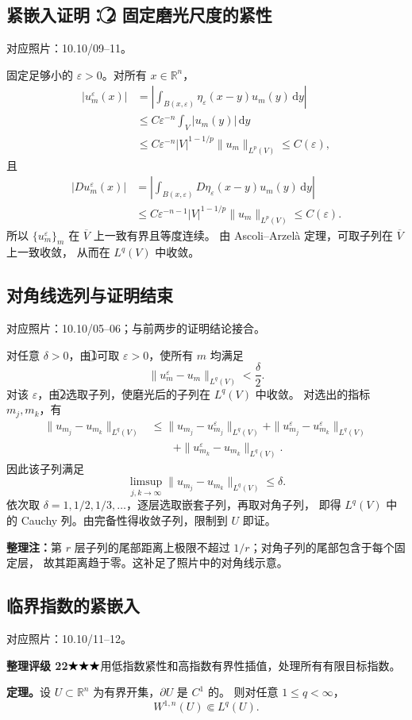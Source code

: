 \documentclass[UTF8,a4paper,11pt,fontset=fandol]{ctexart}
\newcommand{\R}{\mathbb R}
\newcommand{\dd}{\,\mathrm d}
\newcommand{\ednote}[1]{\par{\small\color{notegray}\textbf{整理注：}#1}\par}
\newcommand{\source}[1]{{\small\color{notegray}对应照片：#1。}\par}
\newcommand{\proofstars}[1]{\ensuremath{%
\ifnum#1>0\relax\bigstar\fi
\ifnum#1>1\relax\bigstar\fi
\ifnum#1>2\relax\bigstar\fi
\ifnum#1>3\relax\bigstar\fi
\ifnum#1>4\relax\bigstar\fi}}
\newcommand{\proofrating}[3]{\par{\small\color{proofblue}%
\textbf{整理评级 #1}\enspace\proofstars{#2}\quad #3\par}}
\begin{document}
\newpage
\subsection*{紧嵌入证明：\textcircled{2} 固定磨光尺度的紧性}
\source{10.10/09--11}
固定足够小的 $\varepsilon>0$。对所有 $x\in\R^n$，
\[
\begin{aligned}
|u_m^\varepsilon(x)|
&=\left|\int_{B(x,\varepsilon)}\eta_\varepsilon(x-y)u_m(y)\dd y\right|\\
&\leq C\varepsilon^{-n}\int_V|u_m(y)|\dd y\\
&\leq C\varepsilon^{-n}|V|^{1-1/p}\|u_m\|_{L^p(V)}
\leq C(\varepsilon),
\end{aligned}
\]
且
\[
\begin{aligned}
|Du_m^\varepsilon(x)|
&=\left|\int_{B(x,\varepsilon)}D\eta_\varepsilon(x-y)u_m(y)\dd y\right|\\
&\leq C\varepsilon^{-n-1}|V|^{1-1/p}\|u_m\|_{L^p(V)}
\leq C(\varepsilon).
\end{aligned}
\]
所以 $\{u_m^\varepsilon\}_m$ 在 $\overline V$ 上一致有界且等度连续。
由 Ascoli--Arzelà 定理，可取子列在 $\overline V$ 上一致收敛，
从而在 $L^q(V)$ 中收敛。

\subsection*{对角线选列与证明结束}
\source{10.10/05--06；与前两步的证明结论接合}
对任意 $\delta>0$，由\textcircled{1}可取 $\varepsilon>0$，使所有 $m$ 均满足
\[
\|u_m^\varepsilon-u_m\|_{L^q(V)}<\frac\delta2.
\]
对该 $\varepsilon$，由\textcircled{2}选取子列，使磨光后的子列在 $L^q(V)$ 中收敛。
对选出的指标 $m_j,m_k$，有
\[
\begin{aligned}
\|u_{m_j}-u_{m_k}\|_{L^q(V)}
&\leq\|u_{m_j}-u_{m_j}^\varepsilon\|_{L^q(V)}
 +\|u_{m_j}^\varepsilon-u_{m_k}^\varepsilon\|_{L^q(V)}\\
&\qquad+\|u_{m_k}^\varepsilon-u_{m_k}\|_{L^q(V)}.
\end{aligned}
\]
因此该子列满足
\[
\limsup_{j,k\to\infty}\|u_{m_j}-u_{m_k}\|_{L^q(V)}\leq\delta.
\]
依次取 $\delta=1,1/2,1/3,\ldots$，逐层选取嵌套子列，再取对角子列，
即得 $L^q(V)$ 中的 Cauchy 列。由完备性得收敛子列，限制到 $U$ 即证。
\ednote{第 $r$ 层子列的尾部距离上极限不超过 $1/r$；对角子列的尾部包含于每个固定层，
故其距离趋于零。这补足了照片中的对角线示意。}

\newpage
\subsection{临界指数的紧嵌入}
\source{10.10/11--12}
\proofrating{22}{3}{用低指数紧性和高指数有界性插值，处理所有有限目标指数。}
\textbf{定理。}设 $U\subset\R^n$ 为有界开集，$\partial U$ 是 $C^1$ 的。
则对任意 $1\leq q<\infty$，
\[
\boxed{W^{1,n}(U)\Subset L^q(U).}
\]
\end{document}

